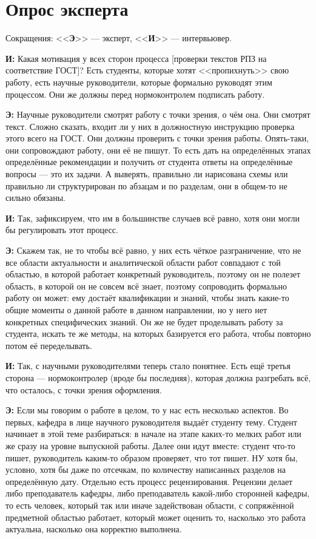 \chapter{Опрос эксперта}

Сокращения: <<\textbf{Э}>> --- эксперт, <<\textbf{И}>> --- интервьювер.

\textbf{И: }Какая мотивация у всех сторон процесса [проверки текстов РПЗ на соответствие ГОСТ]? Есть студенты, которые хотят <<пропихнуть>> свою работу, есть научные руководители, которые формально руководят этим процессом. Они же должны перед нормоконтролем подписать работу.

\textbf{Э: }Научные руководители смотрят работу с точки зрения, о чём она. Они смотрят текст. Сложно сказать, входит ли у них в должностную инструкцию проверка этого всего на ГОСТ. Они должны проверить с точки зрения работы. Опять-таки, они сопровождают работу, они её не пишут. То есть дать на определённых этапах определённые рекомендации и получить от студента ответы на определённые вопросы --- это их задачи. А выверять, правильно ли нарисована схемы или правильно ли структурирован по абзацам и по разделам, они в общем-то не сильно обязаны. 

\textbf{И: }Так, зафиксируем, что им в большинстве случаев всё равно, хотя они могли бы регулировать этот процесс.

\textbf{Э: }Скажем так, не то чтобы всё равно, у них есть чёткое разграничение, что не все области актуальности и аналитической области работ совпадают с той областью, в которой работает конкретный руководитель, поэтому он не полезет область, в которой он не совсем всё знает, поэтому сопроводить формально работу он может: ему достаёт квалификации и знаний, чтобы знать какие-то общие моменты о данной работе в данном направлении, но у него нет конкретных специфических знаний. Он же не будет проделывать работу за студента, искать те же методы, на которых базируется его работа, чтобы повторно потом её переделывать.

\textbf{И: }Так, с научными руководителями теперь стало понятнее. Есть ещё третья сторона --- нормоконтролер (вроде бы последняя), которая должна разгребать всё, что осталось, с точки зрения оформления.

\textbf{Э: }Если мы говорим о работе в целом, то у нас есть несколько аспектов. Во первых, кафедра в лице научного руководителя выдаёт студенту тему. Студент начинает в этой теме разбираться: в начале на этапе каких-то мелких работ или же сразу на уровне выпускной работы. Далее они идут вместе: студент что-то пишет, руководитель каким-то образом проверяет, что тот пишет. НУ хотя бы, условно, хотя бы даже по отсечкам, по количеству написанных разделов на определённую дату. Отдельно есть процесс рецензирования. Рецензии делает либо преподаватель кафедры, либо преподаватель какой-либо сторонней кафедры, то есть человек, который так или иначе задействован области, с сопряжённой предметной областью работает, который может оценить то, насколько это работа актуальна, насколько она корректно выполнена.

